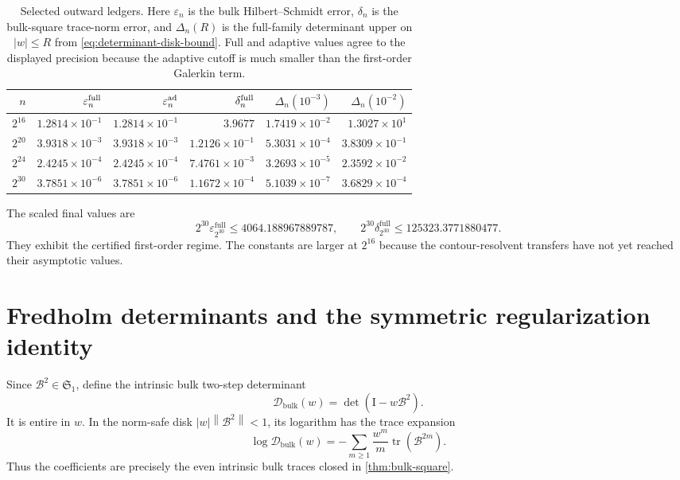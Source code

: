 \documentclass[11pt]{article}
\theoremstyle{definition}
\theoremstyle{remark}
\newcommand{\Id}{\mathrm I}
\newcommand{\cB}{\mathcal B}
\newcommand{\cD}{\mathcal D}
\newcommand{\norm}[1]{\left\lVert #1\right\rVert}
\newcommand{\tr}{\operatorname{tr}}
\newcommand{\detF}{\operatorname{det}}
\begin{document}
\begin{table}[H]
\centering
\small
\begin{tabular}{rrrrrr}
\toprule
$n$ & $\varepsilon_n^{\rm full}$ & $\varepsilon_n^{\rm ad}$
& $\delta_n^{\rm full}$
& $\Delta_n(10^{-3})$ & $\Delta_n(10^{-2})$\\
\midrule
$2^{16}$
& $1.2814\times10^{-1}$ & $1.2814\times10^{-1}$
& $3.9677$ & $1.7419\times10^{-2}$ & $1.3027\times10^{1}$\\
$2^{20}$
& $3.9318\times10^{-3}$ & $3.9318\times10^{-3}$
& $1.2126\times10^{-1}$ & $5.3031\times10^{-4}$ & $3.8309\times10^{-1}$\\
$2^{24}$
& $2.4245\times10^{-4}$ & $2.4245\times10^{-4}$
& $7.4761\times10^{-3}$ & $3.2693\times10^{-5}$ & $2.3592\times10^{-2}$\\
$2^{30}$
& $3.7851\times10^{-6}$ & $3.7851\times10^{-6}$
& $1.1672\times10^{-4}$ & $5.1039\times10^{-7}$ & $3.6829\times10^{-4}$\\
\bottomrule
\end{tabular}
\caption{Selected outward ledgers.  Here $\varepsilon_n$ is the bulk
Hilbert--Schmidt error, $\delta_n$ is the bulk-square trace-norm error, and
$\Delta_n(R)$ is the full-family determinant upper on $|w|\le R$ from
\eqref{eq:determinant-disk-bound}.  Full and adaptive values agree to the
displayed precision because the adaptive cutoff is much smaller than the
first-order Galerkin term.}
\label{tab:certificate}
\end{table}

The scaled final values are
\begin{equation}
 2^{30}\varepsilon_{2^{30}}^{\mathrm{full}}
 \le4064.188967889787,
 \qquad
 2^{30}\delta_{2^{30}}^{\mathrm{full}}
 \le125323.3771880477.
 \label{eq:scaled-final}
\end{equation}
They exhibit the certified first-order regime.  The constants are larger at
$2^{16}$ because the contour-resolvent transfers have not yet reached their
asymptotic values.

\section{Fredholm determinants and the symmetric regularization identity}
\label{sec:determinants}

Since $\cB^2\in\mathfrak S_1$, define the intrinsic bulk two-step
determinant
\begin{equation}
 \cD_{\mathrm{bulk}}(w)
 =\detF(\Id-w\cB^2).
 \label{eq:bulk-square-determinant}
\end{equation}
It is entire in $w$.  In the norm-safe disk
$|w|\norm{\cB^2}<1$, its logarithm has the trace expansion
\begin{equation}
 \log\cD_{\mathrm{bulk}}(w)
 =-\sum_{m\ge1}\frac{w^m}{m}\tr(\cB^{2m}).
 \label{eq:bulk-square-trace-series}
\end{equation}
Thus the coefficients are precisely the even intrinsic bulk traces closed
in \cref{thm:bulk-square}.
\end{document}
